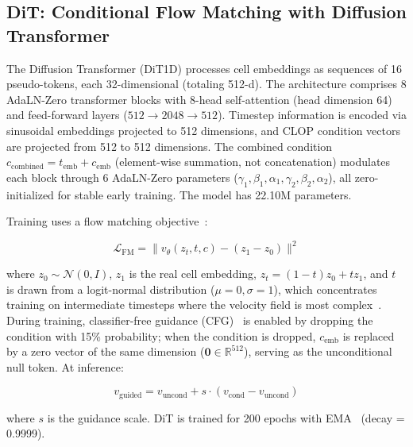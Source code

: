 \documentclass[biology,article,submit,pdftex,moreauthors]{Definitions/mdpi}
\begin{document}
\subsection{DiT: Conditional Flow Matching with Diffusion Transformer}\label{sec:dit}

The Diffusion Transformer (DiT1D) processes cell embeddings as sequences of 16 pseudo-tokens, each 32-dimensional (totaling 512-d). The architecture comprises 8 AdaLN-Zero transformer blocks with 8-head self-attention (head dimension 64) and feed-forward layers ($512 \to 2048 \to 512$). Timestep information is encoded via sinusoidal embeddings projected to 512 dimensions, and CLOP condition vectors are projected from 512 to 512 dimensions. The combined condition $c_\text{combined} = t_\text{emb} + c_\text{emb}$ (element-wise summation, not concatenation) modulates each block through 6 AdaLN-Zero parameters ($\gamma_1, \beta_1, \alpha_1, \gamma_2, \beta_2, \alpha_2$), all zero-initialized for stable early training. The model has 22.10M parameters.

Training uses a flow matching objective~\cite{ref-flow-matching,ref-ot-cfm}:

\begin{linenomath}
\begin{equation}
\mathcal{L}_\text{FM} = \| v_\theta(z_t, t, c) - (z_1 - z_0) \|^2
\label{eq:fm}
\end{equation}
\end{linenomath}

where $z_0 \sim \mathcal{N}(0, I)$, $z_1$ is the real cell embedding, $z_t = (1-t)z_0 + tz_1$, and $t$ is drawn from a logit-normal distribution ($\mu{=}0, \sigma{=}1$), which concentrates training on intermediate timesteps where the velocity field is most complex~\cite{ref-sd3}. During training, classifier-free guidance (CFG)~\cite{ref-cfg} is enabled by dropping the condition with 15\% probability; when the condition is dropped, $c_\text{emb}$ is replaced by a zero vector of the same dimension ($\mathbf{0} \in \mathbb{R}^{512}$), serving as the unconditional null token. At inference:

\begin{linenomath}
\begin{equation}
v_\text{guided} = v_\text{uncond} + s \cdot (v_\text{cond} - v_\text{uncond})
\label{eq:cfg}
\end{equation}
\end{linenomath}

where $s$ is the guidance scale. DiT is trained for 200 epochs with EMA~\cite{ref-ema} (decay = 0.9999).
\end{document}

